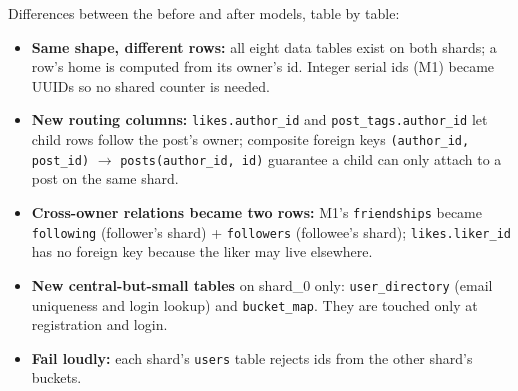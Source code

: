 \noindent Differences between the before and after models, table by table:
\begin{itemize}[nosep,leftmargin=1.2em]
\item \textbf{Same shape, different rows:} all eight data tables exist on both shards; a row's home is
      computed from its owner's id. Integer serial ids (M1) became UUIDs so no shared counter is needed.
\item \textbf{New routing columns:} \texttt{likes.author\_id} and \texttt{post\_tags.author\_id} let child rows
      follow the post's owner; composite foreign keys \texttt{(author\_id, post\_id)} $\to$ \texttt{posts(author\_id, id)}
      guarantee a child can only attach to a post on the same shard.
\item \textbf{Cross-owner relations became two rows:} M1's \texttt{friendships} became \texttt{following}
      (follower's shard) + \texttt{followers} (followee's shard); \texttt{likes.liker\_id} has no foreign key because
      the liker may live elsewhere.
\item \textbf{New central-but-small tables} on shard\_0 only: \texttt{user\_directory} (email uniqueness and
      login lookup) and \texttt{bucket\_map}. They are touched only at registration and login.
\item \textbf{Fail loudly:} each shard's \texttt{users} table rejects ids from the other shard's buckets.
\end{itemize}
